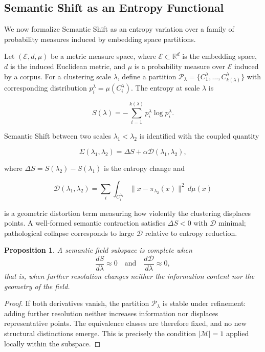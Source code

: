 \documentclass[11pt, twoside]{article}
\theoremstyle{plain}
\newtheorem{proposition}[theorem]{Proposition}
\theoremstyle{definition}
\theoremstyle{remark}
\begin{document}
\subsection{Semantic Shift as an Entropy Functional}

We now formalize Semantic Shift as an entropy variation over a family of probability measures induced by embedding space partitions.

Let $(\mathcal{E}, d, \mu)$ be a metric measure space, where $\mathcal{E} \subset \mathbb{R}^d$ is the embedding space, $d$ is the induced Euclidean metric, and $\mu$ is a probability measure over $\mathcal{E}$ induced by a corpus. For a clustering scale $\lambda$, define a partition $\mathcal{P}_\lambda = \{C_1^\lambda, \dots, C_{k(\lambda)}^\lambda\}$ with corresponding distribution $p_i^\lambda = \mu(C_i^\lambda)$. The entropy at scale $\lambda$ is

\[
S(\lambda) = -\sum_{i=1}^{k(\lambda)} p_i^\lambda \log p_i^\lambda.
\]

Semantic Shift between two scales $\lambda_1 < \lambda_2$ is identified with the coupled quantity

\[
\Sigma(\lambda_1, \lambda_2) = \Delta S + \alpha \mathcal{D}(\lambda_1, \lambda_2),
\]

where $\Delta S = S(\lambda_2) - S(\lambda_1)$ is the entropy change and

\[
\mathcal{D}(\lambda_1, \lambda_2) = \sum_i \int_{C_i^{\lambda_1}} \|x - \pi_{\lambda_2}(x)\|^2 \, d\mu(x)
\]

is a geometric distortion term measuring how violently the clustering displaces points. A well-formed semantic contraction satisfies $\Delta S < 0$ with $\mathcal{D}$ minimal; pathological collapse corresponds to large $\mathcal{D}$ relative to entropy reduction.

\begin{proposition}
A semantic field subspace is complete when
\[
\frac{dS}{d\lambda} \approx 0 \quad \text{and} \quad \frac{d\mathcal{D}}{d\lambda} \approx 0,
\]
that is, when further resolution changes neither the information content nor the geometry of the field.
\end{proposition}

\begin{proof}
If both derivatives vanish, the partition $\mathcal{P}_\lambda$ is stable under refinement: adding further resolution neither increases information nor displaces representative points. The equivalence classes are therefore fixed, and no new structural distinctions emerge. This is precisely the condition $|\mathcal{M}| = 1$ applied locally within the subspace.
\end{proof}
\end{document}
